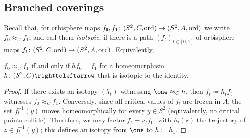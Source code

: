 \documentclass{amsart}
\begin{document}
\subsection{Branched coverings}
Recall that, for orbisphere maps
$f_0,f_1\colon(S^2,C,\operatorname{ord})\to(S^2,A,\operatorname{ord})$ we write
$f_0\approx_C f_1$, and call them \emph{isotopic}, if there is a path
$(f_t)_{t\in[0,1]}$ of orbisphere maps
$f_t\colon(S^2,C,\operatorname{ord})\to(S^2,A,\operatorname{ord})$. Equivalently,
\begin{lem}\label{lem:factorization}
  $f_0\approx_C f_1$ if and only if $h f_0=f_1$ for a homeomorphism
  $h\colon(S^2,C)\selfmap$ that is isotopic to the
  identity.
\end{lem}
\begin{proof}
  If there exists an isotopy $(h_t)$ witnessing $\one\approx_C h$, then
  $f_t\coloneqq h_t f_0$ witnesses $f_0\approx_C f_1$. Conversely,
  since all critical values of $f_t$ are frozen in $A$, the set
  $f_t^{-1}(y)$ moves homeomorphically for every $y\in S^2$
  (equivalently, no critical points collide). Therefore, we may factor
  $f_t = h_t f_0$, with $h_t(z)$ the trajectory of $z\in f_t^{-1}(y)$;
  this defines an isotopy from $\one$ to $h\coloneqq h_1$.
\end{proof}
\end{document}
